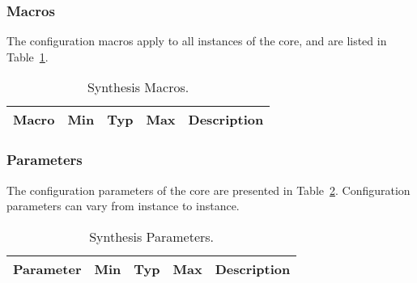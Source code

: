 \ifdefined\SM

\subsubsection{Macros}

The configuration macros apply to all instances of the core, and are listed in
Table~\ref{tab:sm}.

\begin{table}[h]
  \centering
    \begin{tabularx}{\textwidth}{ | c | c | c | c | X | }
    \hline
    \rowcolor{iob-green}
    {\bf Macro} & {\bf Min} & {\bf Typ} & {\bf Max} & {\bf Description} \\\hline

    

    \end{tabularx}
  \caption{Synthesis Macros.}
  \label{tab:sm}
\end{table}

\noindent

\fi


\ifdefined\SP

\subsubsection{Parameters}
\label{sec:cp}

The configuration parameters of the core are presented in
Table~\ref{tab:sp}. Configuration parameters can vary from instance to instance.

\begin{table}[h]
  \centering
    \begin{tabularx}{\textwidth}{ | c | c | c | c | X | }
    \hline
    \rowcolor{iob-green}
    {\bf Parameter} & {\bf Min} & {\bf Typ} & {\bf Max} & {\bf Description} \\\hline

    

    \end{tabularx}
    
\caption{Synthesis Parameters.}
  \label{tab:sp}
\end{table}

\fi
